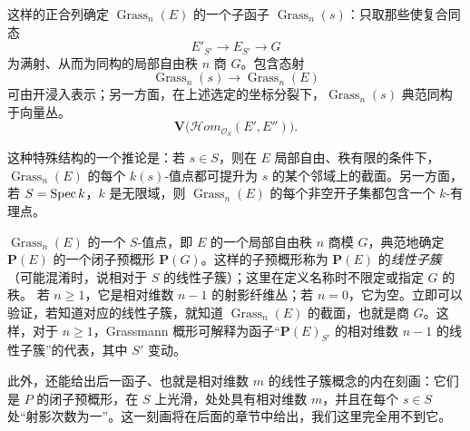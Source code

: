 这样的正合列确定 $\operatorname{Grass}_n(E)$ 的一个子函子 $\operatorname{Grass}_n(s)$：只取那些使复合同态
\[
E'_{S'}\longrightarrow E_{S'}\longrightarrow G
\]
为满射、从而为同构的局部自由秩 $n$ 商 $G$。包含态射
\[
\operatorname{Grass}_n(s)\longrightarrow\operatorname{Grass}_n(E)
\]
可由开浸入表示；另一方面，在上述选定的坐标分裂下，$\operatorname{Grass}_n(s)$ 典范同构于向量丛。
\[
\mathbf V\bigl(\mathscr{H}\!om_{\mathcal O_S}(E',E'')\bigr).
\]

这种特殊结构的一个推论是：若 $s\in S$，则在 $E$ 局部自由、秩有限的条件下，$\operatorname{Grass}_n(E)$ 的每个 $k(s)$-值点都可提升为 $s$ 的某个邻域上的截面。另一方面，若 $S=\operatorname{Spec} k$，$k$ 是无限域，则 $\operatorname{Grass}_n(E)$ 的每个非空开子集都包含一个 $k$-有理点。

$\operatorname{Grass}_n(E)$ 的一个 $S$-值点，即 $E$ 的一个局部自由秩 $n$ 商模 $G$，典范地确定 $\mathbf P(E)$ 的一个闭子预概形 $\mathbf P(G)$。这样的子预概形称为 $\mathbf P(E)$ 的\emph{线性子簇}（可能混淆时，说相对于 $S$ 的线性子簇）；这里在定义名称时不限定或指定 $G$ 的秩。
若 $n\geq1$，它是相对维数 $n-1$ 的射影纤维丛；若 $n=0$，它为空。立即可以验证，若知道对应的线性子簇，就知道 $\operatorname{Grass}_n(E)$ 的截面，也就是商 $G$。这样，对于 $n\geq1$，Grassmann 概形可解释为函子“$\mathbf P(E)_{S'}$ 的相对维数 $n-1$ 的线性子簇”的代表，其中 $S'$ 变动。

此外，还能给出后一函子、也就是相对维数 $m$ 的线性子簇概念的内在刻画：它们是 $P$ 的闭子预概形，在 $S$ 上光滑，处处具有相对维数 $m$，并且在每个 $s\in S$ 处“射影次数为一”。这一刻画将在后面的章节中给出，我们这里完全用不到它。

